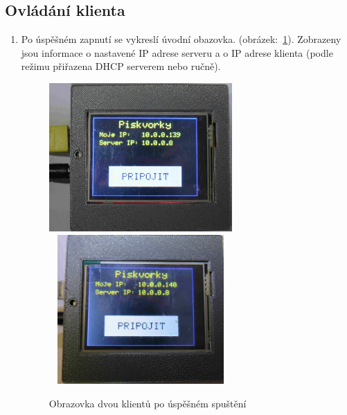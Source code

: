 \subsection{Ovládání klienta}
\begin{enumerate}
\item Po úspěšném zapnutí se vykreslí úvodní obazovka. (obrázek:~\ref{fig:faze1}).  Zobrazeny jsou informace o nastavené IP adrese serveru a o IP adrese klienta (podle režimu přiřazena DHCP serverem nebo ručně).
\begin{figure}[H]
\centering
\includegraphics[width=7cm]{img/gameFlow/phase01a.jpg}
\includegraphics[width=7cm, height=5.7cm]{img/gameFlow/phase01b.jpg}
\caption{\label{fig:faze1} Obrazovka dvou klientů po úspěšném spuštění}
\end{figure}


\end{enumerate}
